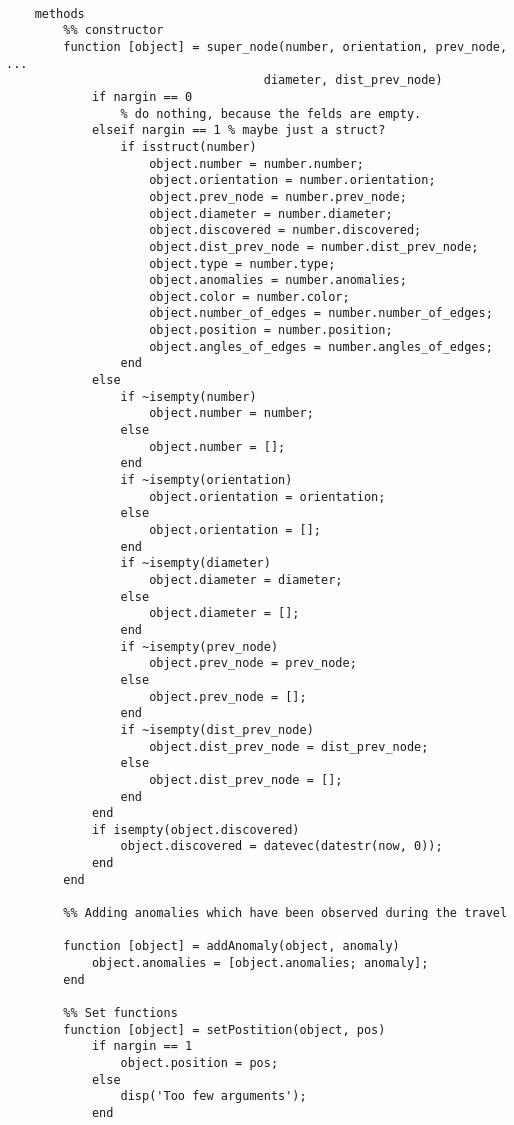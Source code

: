 \begin{lstlisting}
    
    methods
        %% constructor
        function [object] = super_node(number, orientation, prev_node, ...
                                    diameter, dist_prev_node)
            if nargin == 0 
                % do nothing, because the felds are empty.
            elseif nargin == 1 % maybe just a struct?
                if isstruct(number)
                    object.number = number.number;
                    object.orientation = number.orientation;
                    object.prev_node = number.prev_node;
                    object.diameter = number.diameter;
                    object.discovered = number.discovered;
                    object.dist_prev_node = number.dist_prev_node;
                    object.type = number.type;
                    object.anomalies = number.anomalies;
                    object.color = number.color;
                    object.number_of_edges = number.number_of_edges;
                    object.position = number.position;
                    object.angles_of_edges = number.angles_of_edges;
                end
            else
                if ~isempty(number)
                    object.number = number;
                else
                    object.number = [];
                end
                if ~isempty(orientation)
                    object.orientation = orientation;
                else
                    object.orientation = [];
                end
                if ~isempty(diameter)
                    object.diameter = diameter;
                else
                    object.diameter = [];
                end
                if ~isempty(prev_node)
                    object.prev_node = prev_node;
                else
                    object.prev_node = [];
                end
                if ~isempty(dist_prev_node)
                    object.dist_prev_node = dist_prev_node;
                else
                    object.dist_prev_node = [];
                end
            end 
            if isempty(object.discovered)
                object.discovered = datevec(datestr(now, 0));
            end
        end
        
        %% Adding anomalies which have been observed during the travel
        
        function [object] = addAnomaly(object, anomaly)
            object.anomalies = [object.anomalies; anomaly];
        end
        
        %% Set functions
        function [object] = setPostition(object, pos)
            if nargin == 1
                object.position = pos;
            else
                disp('Too few arguments');
            end
            

\end{lstlisting}
